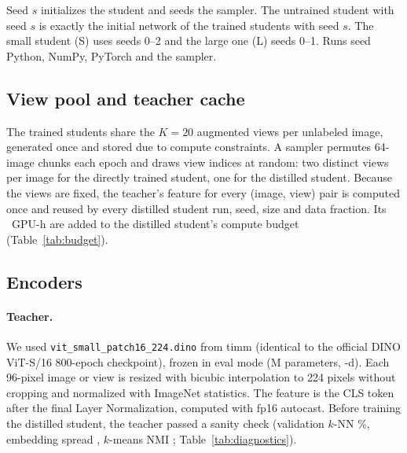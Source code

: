 \documentclass[letterpaper,11pt]{article}
\begin{document}
Seed $s$ initializes the student and seeds the sampler. The untrained student with seed $s$ is exactly the
initial network of the trained students with seed $s$. The small student (S) uses seeds 0--2 and the
large one (L) seeds 0--1. Runs seed Python, NumPy, PyTorch and the sampler.

\subsection{View pool and teacher cache}
\label{sec:pool}

The trained students share the $K=20$ augmented views per unlabeled image, generated
once and stored due to compute constraints. A sampler permutes 64-image chunks each epoch and draws view indices at random: two distinct views per image
for the directly trained student, one for the distilled student. Because the views are fixed, the teacher's feature for every (image, view)
pair is computed once and reused by every distilled student run, seed, size and data
fraction. Its \GpuHTeacherCache~GPU-h are added to the distilled student's compute budget (Table~\ref{tab:budget}).

\subsection{Encoders}
\label{sec:encoders}

\paragraph{Teacher.} We used \texttt{vit\_small\_patch16\_224.dino} from timm (identical to the official DINO ViT-S/16 800-epoch checkpoint), frozen in eval mode
(\ParamsD{}M parameters, \FeatDimD-d). Each 96-pixel image or view is resized with bicubic interpolation to
224 pixels without cropping and normalized with ImageNet statistics. The feature is the CLS
token after the final Layer Normalization, computed with fp16 autocast. Before training the distilled student, the teacher passed a sanity check (validation $k$-NN \ValKnnD\%, embedding
spread \SpreadD, $k$-means NMI \NmiValD; Table~\ref{tab:diagnostics}).
\end{document}
